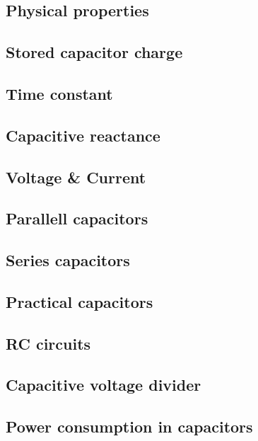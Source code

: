 \subsection{Physical properties}
\subsection{Stored capacitor charge}
\subsection{Time constant}
\subsection{Capacitive reactance}
\subsection{Voltage \& Current}
\subsection{Parallell capacitors}
\subsection{Series capacitors}
\subsection{Practical capacitors}
\subsection{RC circuits}
\subsection{Capacitive voltage divider}
\subsection{Power consumption in capacitors}

